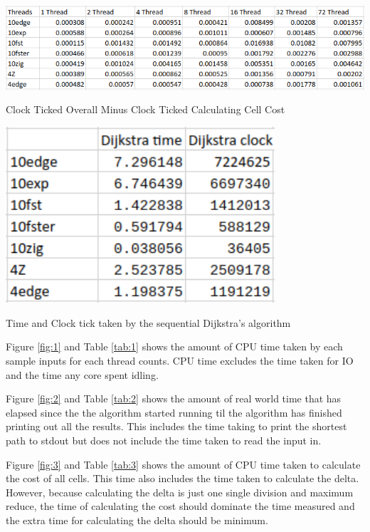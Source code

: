 \documentclass{article}
\begin{document}
\begin{table}[!htb]
\includegraphics[width=\textwidth]{path-finding-time-table.png}
\caption{Clock Ticked Overall Minus Clock Ticked Calculating Cell Cost}
\label{tab:6}
\end{table}

\begin{table}[!htb]
\includegraphics[width=10cm]{dijkstra-table.png}
\caption{Time and Clock tick taken by the sequential Dijkstra's algorithm}
\label{tab:7}
\end{table}

Figure \ref{fig:1} and Table \ref{tab:1} shows the amount of CPU time taken by each sample inputs
for each thread counts. CPU time excludes the time taken for IO and the time any core spent idling.

Figure \ref{fig:2} and Table \ref{tab:2} shows the amount of real world time that has elapsed since
the the algorithm started running til the algorithm has finished printing out all the results. This
includes the time taking to print the shortest path to stdout but does not include the time taken to
read the input in.

Figure \ref{fig:3} and Table \ref{tab:3} shows the amount of CPU time taken to calculate the cost of
all cells. This time also includes the time taken to calculate the delta. However, because
calculating the delta is just one single division and maximum reduce, the time of calculating the
cost should dominate the time measured and the extra time for calculating the delta should be
minimum.
\end{document}
